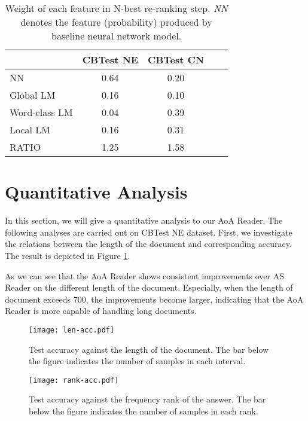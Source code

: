 \documentclass[11pt,a4paper]{article}
\begin{document}
        \begin{table}[tp]
        \begin{center}
        \begin{tabular}{lcccc}
        \toprule
        & {\centering CBTest NE} & {\centering CBTest CN} \\
        \midrule
        NN & 0.64 & 0.20 \\
        Global LM & 0.16 & 0.10 \\
        Word-class LM & 0.04 & 0.39 \\
        Local LM & 0.16 & 0.31 \\
        \hline
        RATIO  & 1.25 & 1.58 \\
        \bottomrule
        \end{tabular}
        \end{center}
        \caption{\label{weights-cbt} Weight of each feature in N-best re-ranking step. {\em NN} denotes the feature (probability) produced by baseline neural network model.
         }
        \end{table}
        

\section{Quantitative Analysis}\label{analysis}

In this section, we will give a quantitative analysis to our AoA Reader. The following analyses are carried out on CBTest NE dataset.
First, we investigate the relations between the length of the document and corresponding accuracy. The result is depicted in Figure \ref{length-acc}. 

As we can see that the AoA Reader shows consistent improvements over AS Reader on the different length of the document.
Especially, when the length of document exceeds 700, the improvements become larger, indicating that the AoA Reader is more capable of handling long documents.

\begin{figure}[ht]
  \centering
  \texttt{[image: len-acc.pdf]}
  \caption{\label{length-acc} Test accuracy against the length of the document. The bar below the figure indicates the number of samples in each interval.}
\end{figure}

\begin{figure}[ht]
  \centering
  \texttt{[image: rank-acc.pdf]}
  \caption{\label{rank-acc} Test accuracy against the frequency rank of the answer. The bar below the figure indicates the number of samples in each rank.}
\end{figure}
\end{document}
